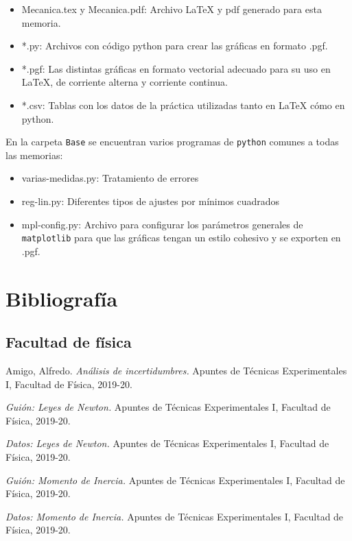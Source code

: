 \documentclass[12pt, a4paper, titlepage]{article}
\newcommand{\code}[1]{\texttt{#1}} %
\begin{document}
  \begin{itemize}[label=$-$]
    \item Mecanica.tex y Mecanica.pdf: Archivo LaTeX y pdf generado para esta memoria.
    \item *.py: Archivos con código python para crear las gráficas en formato .pgf.
    \item *.pgf: Las distintas gráficas en formato vectorial adecuado para su uso en LaTeX, de corriente alterna y corriente continua.
    \item *.csv: Tablas con los datos de la práctica utilizadas tanto en LaTeX cómo en python.
  \end{itemize}

  En la carpeta \code{Base} se encuentran varios programas de \code{python} comunes a todas las memorias:

  \begin{itemize}[label=$-$]
    \item varias-medidas.py: Tratamiento de errores
    \item reg-lin.py: Diferentes tipos de ajustes por mínimos cuadrados
    \item mpl-config.py: Archivo para configurar los parámetros generales de \code{matplotlib} para que las gráficas tengan un estilo cohesivo y se exporten en .pgf.
  \end{itemize}

  \section*{Bibliografía}

  \subsection*{Facultad de física}

  Amigo, Alfredo. \textit{Análisis de incertidumbres.} Apuntes de Técnicas Experimentales I, Facultad de Física, 2019-20.

  \textit{Guión: Leyes de Newton.} Apuntes de Técnicas Experimentales I, Facultad de Física, 2019-20.

  \textit{Datos: Leyes de Newton.} Apuntes de Técnicas Experimentales I, Facultad de Física, 2019-20.

  \textit{Guión: Momento de Inercia.} Apuntes de Técnicas Experimentales I, Facultad de Física, 2019-20.

  \textit{Datos: Momento de Inercia.} Apuntes de Técnicas Experimentales I, Facultad de Física, 2019-20.
\end{document}
